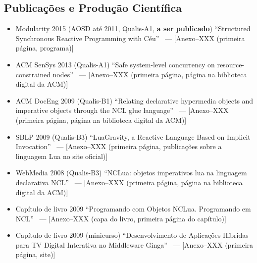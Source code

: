 \documentclass[12pt,a4paper]{article}
\begin{document}
\subsection*{Publicações e Produção Científica}

\begin{itemize}

\item Modularity 2015 (AOSD até 2011, Qualis-A1, \textbf{a ser publicado})
``Structured Synchronous Reactive Programming with Céu''~\cite{ceu.mod15}
--- [Anexo--XXX (primeira página, programa)]

\item ACM SenSys 2013 (Qualis-A1)
``Safe system-level concurrency on resource-constrained 
nodes''~\cite{ceu.sensys13}
--- [Anexo--XXX (primeira página, página na biblioteca digital da ACM)]

\item ACM DocEng 2009 (Qualis-B1)
``Relating declarative hypermedia objects and imperative objects through the 
NCL glue language''~\cite{nclua.doceng}
--- [Anexo--XXX (primeira página, página na biblioteca digital da ACM)]

\item SBLP 2009 (Qualis-B3)
``LuaGravity, a Reactive Language Based on Implicit 
Invocation''~\cite{luagravity.sblp}
--- [Anexo--XXX (primeira página, publicações sobre a linguagem Lua no site 
oficial)]

\item WebMedia 2008 (Qualis-B3)
``NCLua: objetos imperativos lua na linguagem declarativa 
NCL''~\cite{nclua.webmedia}
--- [Anexo--XXX (primeira página, página na biblioteca digital da ACM)]

\item Capítulo de livro 2009
``Programando com Objetos NCLua. Programando em NCL''~\cite{nclua.book}
--- [Anexo--XXX (capa do livro, primeira página do capítulo)]

\item Capítulo de livro 2009 (minicurso)
``Desenvolvimento de Aplicações Híbridas para TV Digital Interativa no 
Middleware Ginga''~\cite{nclua.shortcourse}
--- [Anexo--XXX (primeira página, site)]

\end{itemize}
\end{document}
